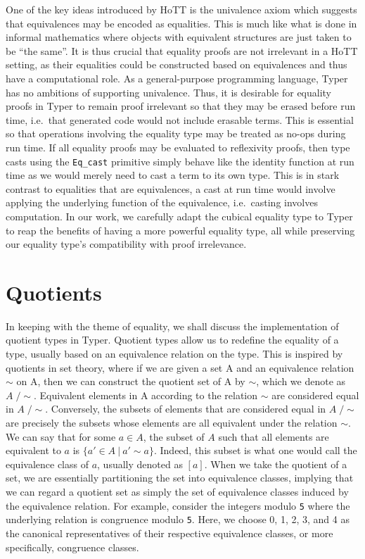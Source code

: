 \documentclass[12pt,twoside,maitrise]{dms}
\theoremstyle{definition}
\numberwithin{equation}{section}
\numberwithin{table}{chapter}
\numberwithin{figure}{chapter}
\newcommand\id[1] {\texttt{#1}}
\newcommand\fn[1] {\texttt{#1}}
\begin{document}
One of the key ideas introduced by HoTT is the univalence axiom which suggests
that equivalences may be encoded as equalities. This is much like what is done
in informal mathematics where objects with equivalent structures are just taken
to be ``the same''. It is thus crucial that equality proofs are not
irrelevant in a HoTT setting, as their equalities could be constructed based on
equivalences and thus have a computational role. As a general-purpose
programming language, Typer has no ambitions of supporting univalence. Thus, it
is desirable for equality proofs in Typer to remain proof irrelevant so that
they may be erased before run time, i.e.\ that generated code would not include
erasable terms. This is essential so that operations involving the equality
type may be treated as no-ops during run time. If all equality proofs may be
evaluated to reflexivity proofs, then type casts using the \fn{Eq\_cast}
primitive simply behave like the identity function at run time as we would merely
need to cast a term to its own type. This is in stark contrast to equalities
that are equivalences, a cast at run time would involve applying the underlying
function of the equivalence, i.e.\ casting involves computation. In our work, we
carefully adapt the cubical equality type to Typer to reap the benefits of
having a more powerful equality type, all while preserving our equality type's
compatibility with proof irrelevance.

\section{Quotients}

In keeping with the theme of equality, we shall discuss the implementation of
quotient types in Typer. Quotient types allow us to redefine the equality of a
type, usually based on an equivalence relation on the type. This is inspired by
quotients in set theory, where if we are given a set A and an equivalence
relation $\sim$ on A, then we can construct the quotient set of A by $\sim$,
which we denote as $A\; / \sim$. Equivalent elements in A according to the
relation $\sim$ are considered equal in $A\; / \sim$. Conversely, the subsets of
elements that are considered equal in $A\; / \sim$ are precisely the subsets
whose elements are all equivalent under the relation $\sim$. We can say that for
some $a \in A$, the subset of $A$ such that all elements are equivalent to $a$
is $\{a' \in A \ | \ a' \sim a \}$. Indeed, this subset is what one would call
the equivalence class of $a$, usually denoted as $[a]$. When we take the
quotient of a set, we are essentially partitioning the set into equivalence
classes, implying that we can regard a quotient set as simply the set of
equivalence classes induced by the equivalence relation. For example, consider
the integers modulo \id{5} where the underlying relation is congruence modulo
\id{5}. Here, we choose 0, 1, 2, 3, and 4 as the canonical representatives of
their respective equivalence classes, or more specifically, congruence classes.
\end{document}
